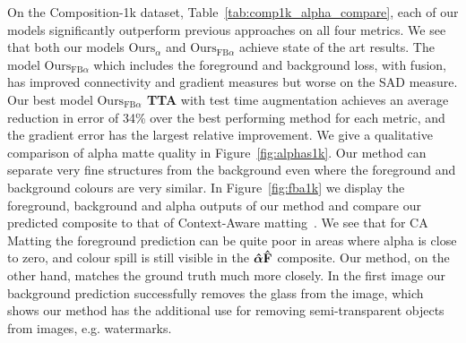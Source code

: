 \documentclass[runningheads]{llncs}
\begin{document}
On the Composition-1k dataset, Table~\ref{tab:comp1k_alpha_compare}, each of our models significantly outperform previous approaches on all four metrics. We see that both our models \textbf{$\text{Ours}_{\alpha}$} and \textbf{$\text{Ours}_{\mathrm{FB}\alpha}$} achieve state of the art results. The model \textbf{$\text{Ours}_{\mathrm{FB}\alpha}$} which includes the foreground and background loss, with fusion, has improved connectivity and gradient measures but worse on the SAD measure.
Our best model \textbf{$\text{Ours}_{\mathrm{FB}\alpha}$ TTA} with test time augmentation achieves an average reduction in error of 34\% over the best performing method for each metric, and the gradient error has the largest relative improvement. 
We give a qualitative comparison of alpha matte quality in Figure~\ref{fig:alphas1k}. Our method can separate very fine structures from the background even where the foreground and background colours are very similar.  In Figure~\ref{fig:fba1k} we display the foreground, background and alpha outputs of our method and compare our predicted composite to that of Context-Aware matting~\cite{ContextMatting}. We see that for CA Matting the foreground prediction can be quite poor in areas where alpha is close to zero, and colour spill is still visible in the $\bm{\hat{\alpha}}\mathbf{\hat{{F}}}$ composite. Our method, on the other hand, matches the ground truth much more closely. In the first image our background prediction successfully removes the glass from the image, which shows our method has the additional use for removing semi-transparent objects from images, e.g. watermarks.
\end{document}
